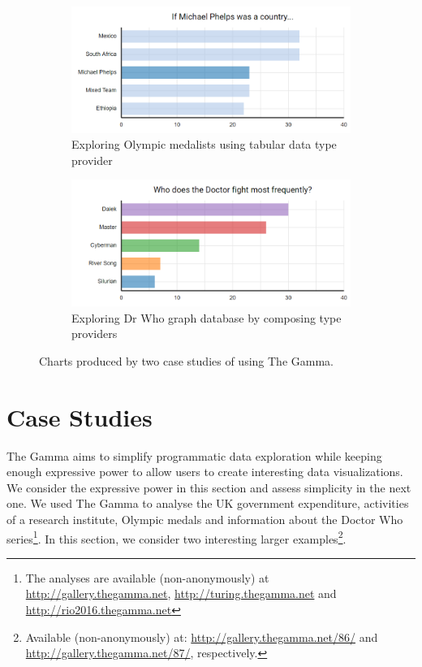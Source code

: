 \documentclass[manuscript,review,anonymous]{acmart}
\begin{document}
\begin{figure}[b]
\centering
\begin{subfigure}[b]{0.49\textwidth}
  \centering
  \includegraphics[width=1\columnwidth]{figures/cases-mp}
  \caption{Exploring Olympic medalists using tabular data type provider}
  \label{fig:cases-mp}
\end{subfigure}
\hfill
\begin{subfigure}[b]{0.49\textwidth}
  \centering
  \includegraphics[width=1\columnwidth]{figures/cases-dr}
  \caption{Exploring Dr Who graph database by composing type providers}
  \label{fig:cases-dr}
\end{subfigure}
\vspace{-0.5em}
\caption{Charts produced by two case studies of using The Gamma.}
\label{fig:cases}
\end{figure}


\section{Case Studies}
\label{sec:cases}

The Gamma aims to simplify programmatic data exploration while keeping enough expressive power
to allow users to create interesting data visualizations. We consider the expressive power in
this section and assess simplicity in the next one. We used The Gamma to analyse
the UK government expenditure, activities of a research institute, Olympic medals and
information about the Doctor Who series\footnote{The analyses are available (non-anonymously)
at \url{http://gallery.thegamma.net}, \url{http://turing.thegamma.net} and \url{http://rio2016.thegamma.net}}.
In this section, we consider two interesting larger examples\footnote{Available
(non-anonymously) at: \url{http://gallery.thegamma.net/86/} and  \url{http://gallery.thegamma.net/87/}, respectively.}.
\end{document}
